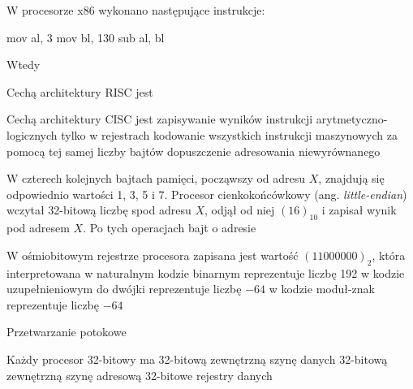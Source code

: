 \begin{problems}
    \prob W procesorze x86 wykonano następujące instrukcje:
    \begin{gas}
        mov al, 3
        mov bl, 130
        sub al, bl
    \end{gas}
    Wtedy

    \prob Cechą architektury RISC jest

    \prob Cechą architektury CISC jest
    \answers
    {zapisywanie wyników instrukcji arytmetyczno-logicznych tylko w rejestrach}
    {kodowanie wszystkich instrukcji maszynowych za pomocą tej samej liczby bajtów}
    {dopuszczenie adresowania niewyrównanego}

    \prob W czterech kolejnych bajtach pamięci, począwszy od adresu $X$, znajdują się odpowiednio wartości 1, 3, 5 i 7. Procesor cienkokońcówkowy (ang. \textit{little-endian}) wczytał 32-bitową liczbę spod adresu $X$, odjął od niej $(16)_{10}$ i zapisał wynik pod adresem $X$. Po tych operacjach bajt o adresie

    \prob W ośmiobitowym rejestrze procesora zapisana jest wartość $(11000000)_2$, która interpretowana
    \answers
    {w naturalnym kodzie binarnym reprezentuje liczbę 192}
    {w kodzie uzupełnieniowym do dwójki reprezentuje liczbę $-64$}
    {w kodzie moduł-znak reprezentuje liczbę $-64$}

    \prob Przetwarzanie potokowe

    \textbf{}

    \prob Każdy procesor 32-bitowy ma
    \answers
    {32-bitową zewnętrzną szynę danych}
    {32-bitową zewnętrzną szynę adresową}
    {32-bitowe rejestry danych}
    
    \textbf{}
\end{problems} 

